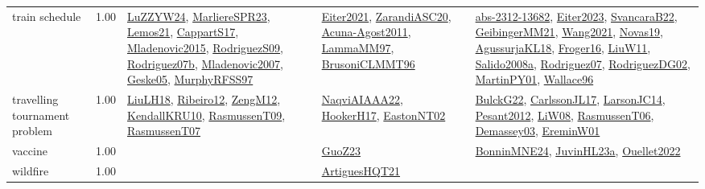 {\begin{longtable}{p{3cm}r>{\raggedright\arraybackslash}p{6cm}>{\raggedright\arraybackslash}p{6cm}>{\raggedright\arraybackslash}p{8cm}}
\index{train schedule}\index{ApplicationAreas!train schedule}train schedule &  1.00 & \hyperref[detail:LuZZYW24]{LuZZYW24}, \hyperref[detail:MarliereSPR23]{MarliereSPR23}, \hyperref[detail:Lemos21]{Lemos21}, \hyperref[detail:CappartS17]{CappartS17}, \hyperref[detail:Mladenovic2015]{Mladenovic2015}, \hyperref[detail:RodriguezS09]{RodriguezS09}, \hyperref[detail:Rodriguez07b]{Rodriguez07b}, \hyperref[detail:Mladenovic2007]{Mladenovic2007}, \hyperref[detail:Geske05]{Geske05}, \hyperref[detail:MurphyRFSS97]{MurphyRFSS97} & \hyperref[detail:Eiter2021]{Eiter2021}, \hyperref[detail:ZarandiASC20]{ZarandiASC20}, \hyperref[detail:Acuna-Agost2011]{Acuna-Agost2011}, \hyperref[detail:LammaMM97]{LammaMM97}, \hyperref[detail:BrusoniCLMMT96]{BrusoniCLMMT96} & \hyperref[detail:abs-2312-13682]{abs-2312-13682}, \hyperref[detail:Eiter2023]{Eiter2023}, \hyperref[detail:SvancaraB22]{SvancaraB22}, \hyperref[detail:GeibingerMM21]{GeibingerMM21}, \hyperref[detail:Wang2021]{Wang2021}, \hyperref[detail:Novas19]{Novas19}, \hyperref[detail:AgussurjaKL18]{AgussurjaKL18}, \hyperref[detail:Froger16]{Froger16}, \hyperref[detail:LiuW11]{LiuW11}, \hyperref[detail:Salido2008a]{Salido2008a}, \hyperref[detail:Rodriguez07]{Rodriguez07}, \hyperref[detail:RodriguezDG02]{RodriguezDG02}, \hyperref[detail:MartinPY01]{MartinPY01}, \hyperref[detail:Wallace96]{Wallace96}\\
\index{travelling tournament problem}\index{ApplicationAreas!travelling tournament problem}travelling tournament problem &  1.00 & \hyperref[detail:LiuLH18]{LiuLH18}, \hyperref[detail:Ribeiro12]{Ribeiro12}, \hyperref[detail:ZengM12]{ZengM12}, \hyperref[detail:KendallKRU10]{KendallKRU10}, \hyperref[detail:RasmussenT09]{RasmussenT09}, \hyperref[detail:RasmussenT07]{RasmussenT07} & \hyperref[detail:NaqviAIAAA22]{NaqviAIAAA22}, \hyperref[detail:HookerH17]{HookerH17}, \hyperref[detail:EastonNT02]{EastonNT02} & \hyperref[detail:BulckG22]{BulckG22}, \hyperref[detail:CarlssonJL17]{CarlssonJL17}, \hyperref[detail:LarsonJC14]{LarsonJC14}, \hyperref[detail:Pesant2012]{Pesant2012}, \hyperref[detail:LiW08]{LiW08}, \hyperref[detail:RasmussenT06]{RasmussenT06}, \hyperref[detail:Demassey03]{Demassey03}, \hyperref[detail:EreminW01]{EreminW01}\\
\index{vaccine}\index{ApplicationAreas!vaccine}vaccine &  1.00 &  & \hyperref[detail:GuoZ23]{GuoZ23} & \hyperref[detail:BonninMNE24]{BonninMNE24}, \hyperref[detail:JuvinHL23a]{JuvinHL23a}, \hyperref[detail:Ouellet2022]{Ouellet2022}\\
\index{wildfire}\index{ApplicationAreas!wildfire}wildfire &  1.00 &  & \hyperref[detail:ArtiguesHQT21]{ArtiguesHQT21} & \\

\end{longtable}}
